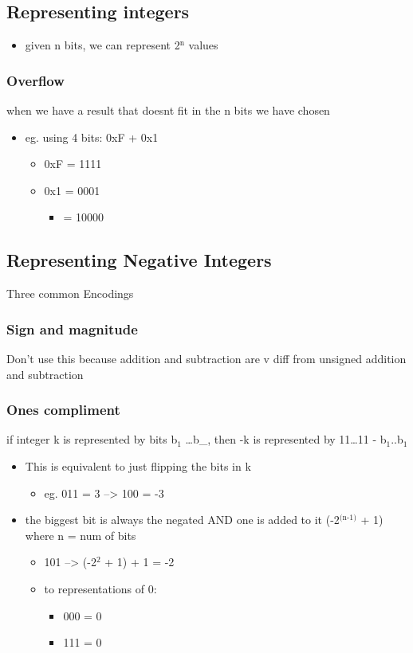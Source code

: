 \documentclass[11pt]{article}
\begin{document}
\subsection{Representing integers}
\label{sec-4-1}
\begin{itemize}
\item given n bits, we can represent 2$^{\text{n}}$ values
\end{itemize}
\subsubsection{Overflow}
\label{sec-4-1-1}
when we have a result that doesnt fit in the n bits we have chosen
\begin{itemize}
\item eg. using 4 bits: 0xF + 0x1
\begin{itemize}
\item 0xF = 1111
\item 0x1 = 0001
\begin{itemize}
\item = 10000
\end{itemize}
\end{itemize}
\end{itemize}
\subsection{Representing Negative Integers}
\label{sec-4-2}
Three common Encodings
\subsubsection{Sign and magnitude}
\label{sec-4-2-1}
Don't use this because addition and subtraction are v diff from unsigned addition and subtraction
\subsubsection{Ones compliment}
\label{sec-4-2-2}
if integer k is represented by bits b$_{\text{1}}$ \ldots{}b\_, then -k is represented by 11\ldots{}11 - b$_{\text{1}}$..b$_{\text{1}}$
\begin{itemize}
\item This is equivalent to just flipping the bits in k
\begin{itemize}
\item eg. 011 = 3 --> 100 = -3
\end{itemize}
\item the biggest bit is always the negated AND one is added to it (-2$^{\text{(n-1)}}$ + 1) where n = num of bits
\begin{itemize}
\item 101 --> (-2$^{\text{2}}$ + 1) + 1 = -2
\item to representations of 0:
\begin{itemize}
\item 000 = 0
\item 111 = 0
\end{itemize}
\end{itemize}
\end{itemize}
\end{document}
